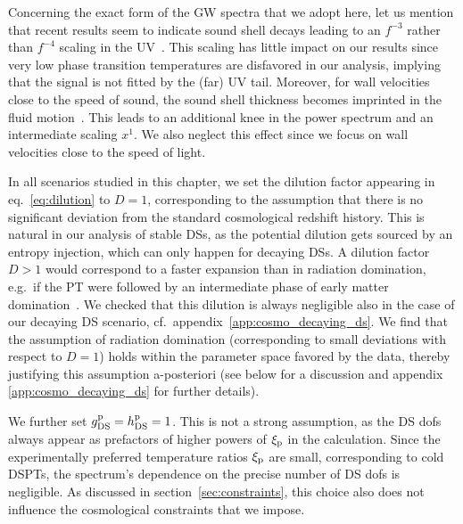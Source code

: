 Concerning the exact form of the \ac{GW} spectra that we adopt here, let us mention that recent results seem to indicate sound shell decays leading to an $f^{-3}$ rather than $f^{-4}$ scaling in the \ac{UV}~\cite{Jinno:2022mie}. This scaling has little impact on our results since very low phase transition temperatures are disfavored in our analysis,  implying that the signal is not fitted by the (far) \ac{UV} tail. Moreover, for wall velocities close to the speed of sound, the sound shell thickness becomes imprinted in the fluid motion~\cite{Hindmarsh:2016lnk, Jinno:2020eqg, Jinno:2022mie, Hindmarsh:2019phv}. This leads to an additional knee in the power spectrum and an intermediate scaling $x^1$. We also neglect this effect since we focus on wall velocities close to the speed of light.

In all scenarios studied in this chapter, we set the dilution factor appearing in eq.~\eqref{eq:dilution} to $D = 1$, corresponding to the assumption that there is no significant deviation from the standard cosmological redshift history. This is natural in our analysis  of stable \acp{DS}, as the potential dilution gets sourced by an entropy injection, which can only happen for decaying \acp{DS}. A dilution factor $D > 1$ would correspond to a faster expansion than in radiation domination, e.g.~if the \ac{PT} were followed by an intermediate phase of early matter domination~\cite{Ertas:2021xeh}. We checked that this dilution is always negligible also in the case of our decaying \ac{DS} scenario, cf.~appendix~\ref{app:cosmo_decaying_ds}. We find that the assumption of radiation domination (corresponding to small deviations with respect to $D = 1$) holds within the parameter space favored by the data, thereby justifying this assumption a-posteriori (see below for a discussion and appendix \ref{app:cosmo_decaying_ds} for further details).

We further set $g_{\text{DS}}^{\text{p}} = h_{\text{DS}}^{\text{p}} = 1$. This is not a strong assumption, as the \ac{DS} \acp{dof} always appear as prefactors of higher powers of  $\xi_{\text{p}}$ in the calculation. Since the experimentally preferred temperature ratios $\xi_{\text{p}}$ are small, corresponding to cold \acp{DSPT}, the spectrum's dependence on the precise number of \ac{DS} \acp{dof} is negligible. As discussed in section~\ref{sec:constraints}, this choice also does not influence the cosmological constraints that we impose.

